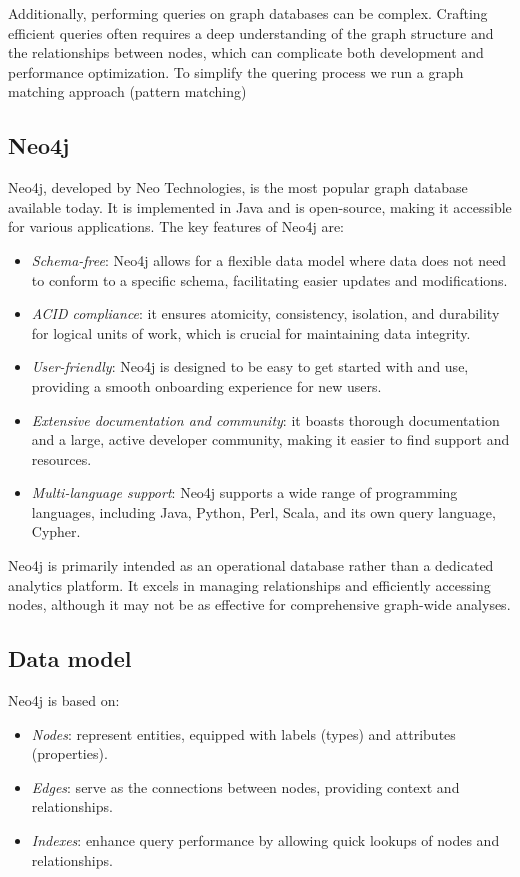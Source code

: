 Additionally, performing queries on graph databases can be complex. 
Crafting efficient queries often requires a deep understanding of the graph structure and the relationships between nodes, which can complicate both development and performance optimization.
To simplify the quering process we run a graph matching approach (pattern matching)

\subsection{Neo4j}
Neo4j, developed by Neo Technologies, is the most popular graph database available today. 
It is implemented in Java and is open-source, making it accessible for various applications.
The key features of Neo4j are: 
\begin{itemize}
    \item \textit{Schema-free}: Neo4j allows for a flexible data model where data does not need to conform to a specific schema, facilitating easier updates and modifications.
    \item \textit{ACID compliance}: it ensures atomicity, consistency, isolation, and durability for logical units of work, which is crucial for maintaining data integrity.
    \item \textit{User-friendly}: Neo4j is designed to be easy to get started with and use, providing a smooth onboarding experience for new users.
    \item \textit{Extensive documentation and community}: it boasts thorough documentation and a large, active developer community, making it easier to find support and resources.
    \item \textit{Multi-language support}: Neo4j supports a wide range of programming languages, including Java, Python, Perl, Scala, and its own query language, Cypher.
\end{itemize}

Neo4j is primarily intended as an operational database rather than a dedicated analytics platform.
It excels in managing relationships and efficiently accessing nodes, although it may not be as effective for comprehensive graph-wide analyses.

\subsection{Data model}
Neo4j is based on: 
\begin{itemize}
    \item \textit{Nodes}: represent entities, equipped with labels (types) and attributes (properties).
    \item \textit{Edges}: serve as the connections between nodes, providing context and relationships.
    \item \textit{Indexes}: enhance query performance by allowing quick lookups of nodes and relationships.
\end{itemize}

